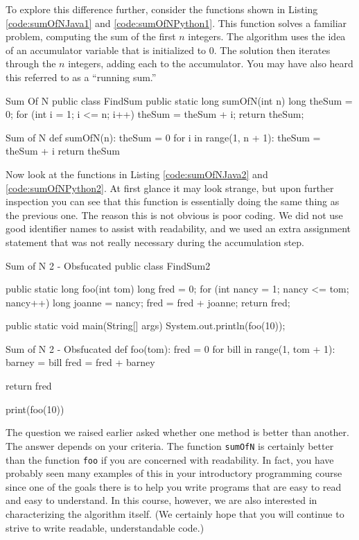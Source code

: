 To explore this difference further, consider the functions shown in Listing \ref{code:sumOfNJava1} and \ref{code:sumOfNPython1}. This function solves a familiar problem, computing the sum of the first $n$ integers. The algorithm uses the idea of an accumulator variable that is initialized to 0. The solution then iterates through the $n$ integers, adding each to the accumulator.  You may have also heard this referred to as a ``running sum.''

\begin{javacode}[label={code:sumOfNJava1}]{Sum Of N}
public class FindSum {
	public static long sumOfN(int n) {
		long theSum = 0;
		for (int i = 1; i <= n; i++) {
			theSum = theSum + i;
		}
		return theSum;
	}
}
\end{javacode}


\begin{pycode}[label={code:sumOfNPython1}]{Sum of N}	
def sumOfN(n):
	theSum = 0
	for i in range(1, n + 1):
		theSum = theSum + i
	return theSum
\end{pycode}

Now look at the functions in Listing \ref{code:sumOfNJava2} and \ref{code:sumOfNPython2}. At first glance it may look strange, but upon further inspection you can see that this function is essentially doing the same thing as the previous one. The reason this is not obvious is poor coding. We did not use good identifier names to assist with readability, and we used an extra assignment statement that was not really necessary during the accumulation step.

\begin{javacode}[label={code:sumOfNJava2}]{Sum of N 2 - Obsfucated}
public class FindSum2 {
	public static long foo(int tom) {
		long fred = 0;
		for (int nancy = 1; nancy <= tom; nancy++) {
			long joanne = nancy;
			fred = fred + joanne;
		}
		return fred;
	}
	
	public static void main(String[] args) {
		System.out.println(foo(10));
	}
}
\end{javacode}

\begin{pycode}[label={code:sumOfNPython2}]{Sum of N 2 - Obsfucated}
def foo(tom):
	fred = 0
	for bill in range(1, tom + 1):
		barney = bill
		fred = fred + barney
	
	return fred

print(foo(10))
\end{pycode}

The question we raised earlier asked whether one method is better than another. The answer depends on your criteria. The function \texttt{sumOfN} is certainly better than the function \texttt{foo} if you are concerned with readability. 
In fact, you have probably seen many examples of this in your introductory programming course since one of the goals there is to help you write programs that are easy to read and easy to understand. 
In this course, however, we are also interested in characterizing the algorithm itself. (We certainly hope that you will continue to strive to write readable, understandable code.)

